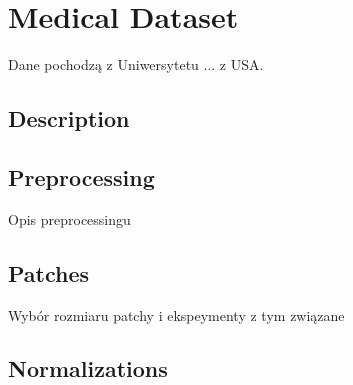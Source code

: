 \chapter{Medical Dataset}

Dane pochodzą z Uniwersytetu ... z USA.

\section{Description}



\section{Preprocessing}

Opis preprocessingu

\section{Patches}

Wybór rozmiaru patchy i ekspeymenty z tym związane

\section{Normalizations}

